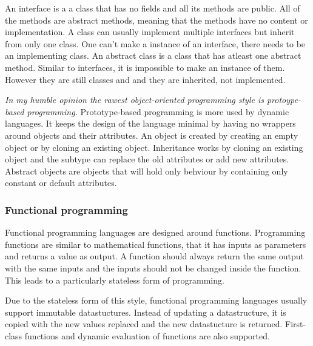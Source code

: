 An interface is a a class that has no fields and all its methods are public. All of the methods are abstract methods, meaning that the methods have no content or implementation. A class can usually implement multiple interfaces but inherit from only one class. One can't make a instance of an interface, there needs to be an implementing class. An abstract class is a class that has atleast one abstract method. Similar to interfaces, it is impossible to make an instance of them. However they are still classes and and they are inherited, not implemented.

\emph{In my humble opinion the rawest object-oriented programming style is protoype-based programming.} Prototype-based programming is more used by dynamic languages. It keeps the design of the language minimal by having no wrappers around objects and their attributes. An object is created by creating an empty object or by cloning an existing object. Inheritance works by cloning an existing object and the subtype can replace the old attributes or add new attributes. Abstract objects are objects that will hold only behviour by containing only constant or default attributes.

\subsubsection{Functional programming}

Functional programming languages are designed around functions. Programming functions are similar to mathematical functions, that it has inputs as parameters and returns a value as output. A function should always return the same output with the same inputs and the inputs should not be changed inside the function. This leads to a particularly stateless form of programming.

Due to the stateless form of this style, functional programming languages
usually support immutable datastuctures. Instead of updating a datastructure, it
is copied with the new values replaced and the new datastucture is returned.
First-class functions and dynamic evaluation of functions are also
supported.\cite{website:persistent-struct}
